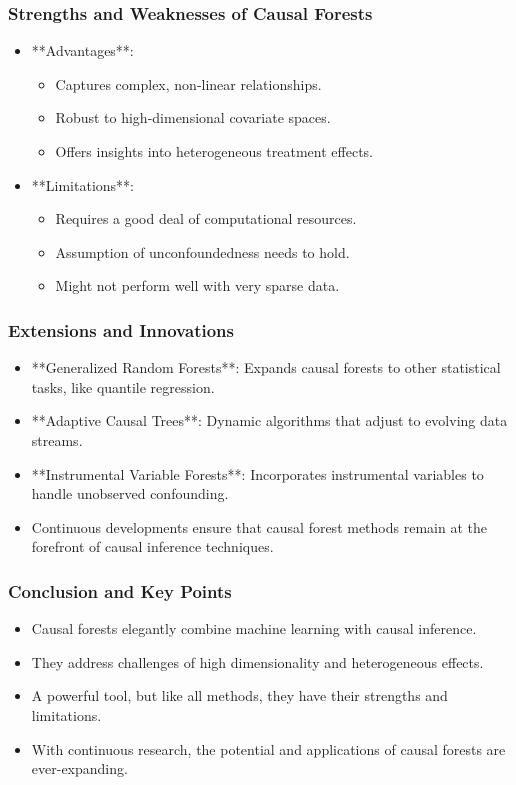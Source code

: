 \documentclass{beamer}
\begin{document}
\begin{frame}
\frametitle{Strengths and Weaknesses of Causal Forests}
\begin{itemize}
    \item **Advantages**:
        \begin{itemize}
            \item Captures complex, non-linear relationships.
            \item Robust to high-dimensional covariate spaces.
            \item Offers insights into heterogeneous treatment effects.
        \end{itemize}
    \item **Limitations**:
        \begin{itemize}
            \item Requires a good deal of computational resources.
            \item Assumption of unconfoundedness needs to hold.
            \item Might not perform well with very sparse data.
        \end{itemize}
\end{itemize}
\end{frame}


\begin{frame}
\frametitle{Extensions and Innovations}
\begin{itemize}
    \item **Generalized Random Forests**: Expands causal forests to other statistical tasks, like quantile regression.
    \item **Adaptive Causal Trees**: Dynamic algorithms that adjust to evolving data streams.
    \item **Instrumental Variable Forests**: Incorporates instrumental variables to handle unobserved confounding.
    \item Continuous developments ensure that causal forest methods remain at the forefront of causal inference techniques.
\end{itemize}
\end{frame}


\begin{frame}
\frametitle{Conclusion and Key Points}
\begin{itemize}
    \item Causal forests elegantly combine machine learning with causal inference.
    \item They address challenges of high dimensionality and heterogeneous effects.
    \item A powerful tool, but like all methods, they have their strengths and limitations.
    \item With continuous research, the potential and applications of causal forests are ever-expanding.
\end{itemize}
\end{frame}
\end{document}
